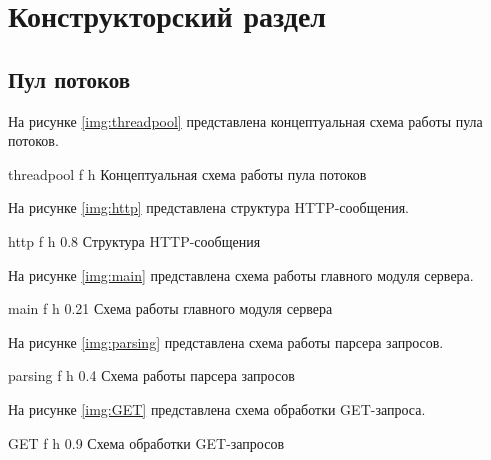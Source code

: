 \chapter{Конструкторский раздел}

\section{Пул потоков}

На рисунке \ref{img:threadpool} представлена концептуальная схема работы пула потоков.

    {threadpool}
    {f}
    {h}
    {\linewidth}
    {Концептуальная схема работы пула потоков}

На рисунке \ref{img:http} представлена структура HTTP-сообщения.

    {http}
    {f}
    {h}
    {0.8\linewidth}
    {Структура HTTP-сообщения}

\clearpage

На рисунке \ref{img:main} представлена схема работы главного модуля сервера.

    {main}
    {f}
    {h}
    {0.21\linewidth}
    {Схема работы главного модуля сервера}

\clearpage

На рисунке \ref{img:parsing} представлена схема работы парсера запросов.

    {parsing}
    {f}
    {h}
    {0.4\linewidth}
    {Схема работы парсера запросов}

\clearpage

На рисунке \ref{img:GET} представлена схема обработки GET-запроса.

    {GET}
    {f}
    {h}
    {0.9\linewidth}
    {Схема обработки GET-запросов}

